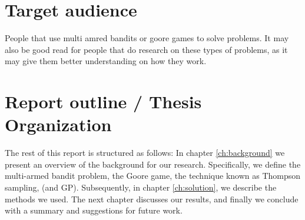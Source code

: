 \section{Target audience}
People that use multi amred bandits or goore games to solve problems. It may also be 
good read for people that do research on these types of problems, as it may give them
better understanding on how they work.

\section{Report outline / Thesis Organization}

The rest of this report is structured as follows: In chapter
\ref{ch:background} we present an overview of the background for our research.
Specifically, we define the multi-armed bandit problem, the Goore game, the
technique known as Thompson sampling, (and GP). Subsequently, in chapter
\ref{ch:solution}, we describe the methods we used. The next chapter discusses
our results, and finally we conclude with a summary and suggestions for future
work.
